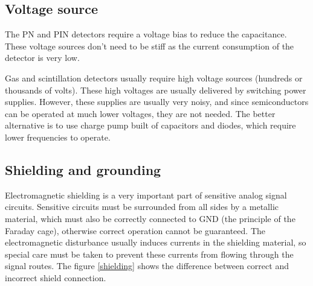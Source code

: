\subsection{Voltage source}
The PN and PIN detectors require a voltage bias to reduce the capacitance.
These voltage sources don't need to be stiff as the current consumption of the detector is very low.
\par
Gas and scintillation detectors usually require high voltage sources (hundreds or thousands of volts). These high voltages are usually delivered by switching power supplies.
However, these supplies are usually very noisy, and since semiconductors can be operated at much lower voltages, they are not needed. The better alternative is to use charge pump built of capacitors and diodes, which require lower frequencies to operate.
\subsection{Shielding and grounding}
Electromagnetic shielding is a very important part of sensitive analog signal circuits. Sensitive circuits must be surrounded from all sides by a metallic material, which must also be correctly connected to GND (the principle of the Faraday cage), otherwise correct operation cannot be guaranteed. The electromagnetic disturbance usually induces currents in the shielding material, so special care must be taken to prevent these currents from flowing through the signal routes. The figure \ref{shielding} shows the difference between correct and incorrect shield connection.

